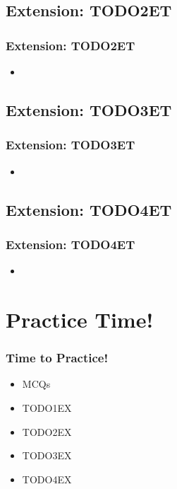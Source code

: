 \documentclass{beamer}
\begin{document}
\subsection{Extension: TODO2ET}
\begin{frame}
    \frametitle{Extension: TODO2ET}
    \begin{itemize}
        \item
    \end{itemize}
\end{frame}
\subsection{Extension: TODO3ET}
\begin{frame}
    \frametitle{Extension: TODO3ET}
    \begin{itemize}
        \item
    \end{itemize}
\end{frame}
\subsection{Extension: TODO4ET}
\begin{frame}
    \frametitle{Extension: TODO4ET}
    \begin{itemize}
        \item
    \end{itemize}
\end{frame}

\section{Practice Time!}
\begin{frame}
    \frametitle{Time to Practice!}
    \begin{itemize}
        \item MCQs
        \item TODO1EX
        \item TODO2EX
        \item TODO3EX
        \item TODO4EX
    \end{itemize}
\end{frame}
\end{document}
